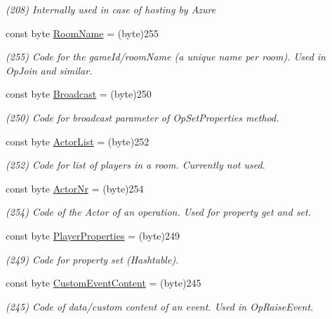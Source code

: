\begin{DoxyCompactItemize}
\begin{DoxyCompactList}\small\item\em (208) Internally used in case of hosting by Azure\end{DoxyCompactList}\item 
const byte \hyperlink{class_exit_games_1_1_client_1_1_photon_1_1_parameter_code_a50a66ff56a083c37980d0ef14d721c7e}{Room\+Name} = (byte)255
\begin{DoxyCompactList}\small\item\em (255) Code for the game\+Id/room\+Name (a unique name per room). Used in Op\+Join and similar.\end{DoxyCompactList}\item 
const byte \hyperlink{class_exit_games_1_1_client_1_1_photon_1_1_parameter_code_aed4f6c5478998620b924bc944fd61799}{Broadcast} = (byte)250
\begin{DoxyCompactList}\small\item\em (250) Code for broadcast parameter of Op\+Set\+Properties method.\end{DoxyCompactList}\item 
const byte \hyperlink{class_exit_games_1_1_client_1_1_photon_1_1_parameter_code_a30b1064fb0e5cb00925779c51b7be59f}{Actor\+List} = (byte)252
\begin{DoxyCompactList}\small\item\em (252) Code for list of players in a room. Currently not used.\end{DoxyCompactList}\item 
const byte \hyperlink{class_exit_games_1_1_client_1_1_photon_1_1_parameter_code_a54da07a3fc0088b2b6a6dac914f7a75f}{Actor\+Nr} = (byte)254
\begin{DoxyCompactList}\small\item\em (254) Code of the Actor of an operation. Used for property get and set.\end{DoxyCompactList}\item 
const byte \hyperlink{class_exit_games_1_1_client_1_1_photon_1_1_parameter_code_ab173474caabd7353e0477f3a04760204}{Player\+Properties} = (byte)249
\begin{DoxyCompactList}\small\item\em (249) Code for property set (Hashtable).\end{DoxyCompactList}\item 
const byte \hyperlink{class_exit_games_1_1_client_1_1_photon_1_1_parameter_code_a170f80778c72f6090e53334c5fe05e3d}{Custom\+Event\+Content} = (byte)245
\begin{DoxyCompactList}\small\item\em (245) Code of data/custom content of an event. Used in Op\+Raise\+Event.\end{DoxyCompactList}\item 

\end{DoxyCompactItemize}
